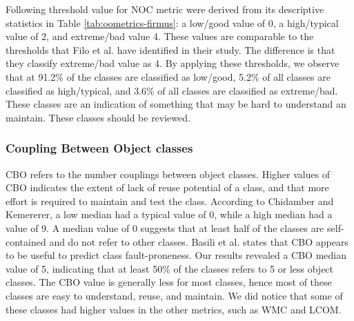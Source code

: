 Following threshold value for NOC metric were derived from its descriptive statistics in Table \ref{tab:oometrics-firmus}: a low/good value of 0, a high/typical value of 2, and extreme/bad value 4. These values are comparable to the thresholds that Filo et al.\cite{tarcisio} have identified in their study. The difference is that they classify extreme/bad value as 4. By applying these thresholds, we observe that at 91.2\% of the classes are classified as low/good, 5.2\% of all classes are classified as high/typical, and 3.6\% of all classes are classified as extreme/bad. These classes are an indication of something that may be hard to understand an maintain. These classes should be reviewed.



\subsubsection{Coupling Between Object classes}

CBO refers to the number couplings between object classes. Higher values of CBO indicates the extent of lack of reuse potential of a class, and that more effort is required to maintain and test the class. According to Chidamber and Kemererer\cite{chidamber1994metrics}, a low median had a typical value of 0, while a high median had a value of 9. A median value of 0 suggests that at least half of the classes are self-contained and do not refer to other classes. Basili et al.\cite{basili1996validation} states that CBO appears to be useful to predict class fault-proneness. Our results revealed a CBO median value of 5, indicating that at least 50\% of the classes refers to 5 or less object classes. The CBO value is generally less for most classes, hence most of these classes are easy to understand, reuse, and maintain. We did notice that some of these classes had higher values in the other metrics, such as WMC and LCOM. 

